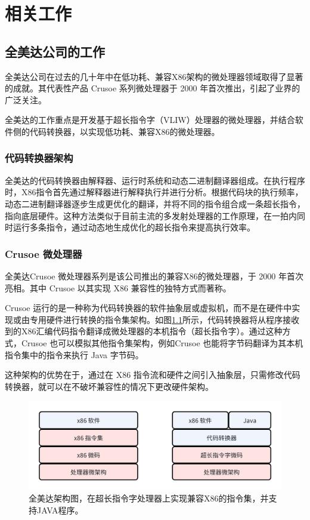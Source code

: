 \chapter{相关工作}\label{chap:related_work}

\section{全美达公司的工作}

全美达公司在过去的几十年中在低功耗、兼容X86架构的微处理器领域取得了显著的成就。其代表性产品 Crusoe 系列微处理器于 2000 年首次推出，引起了业界的广泛关注。

全美达的工作重点是开发基于超长指令字（VLIW）处理器的微处理器，并结合软件侧的代码转换器，以实现低功耗、兼容X86的微处理器。

\subsection{代码转换器架构}

全美达的代码转换器\cite{dehnertTransmetaCodeMorphing2003}由解释器、运行时系统和动态二进制翻译器组成。在执行程序时，X86指令首先通过解释器进行解释执行并进行分析。根据代码块的执行频率，动态二进制翻译器逐步生成更优化的翻译，并将不同的指令组合成一条超长指令，指向底层硬件。这种方法类似于目前主流的多发射处理器的工作原理，在一拍内同时运行多条指令，通过动态地生成优化的超长指令来提高执行效率。

\subsection{Crusoe 微处理器}

全美达Crusoe 微处理器系列是该公司推出的兼容X86的微处理器，于 2000 年首次亮相。其中 Crusoe 以其实现 X86 兼容性的独特方式而著称。

Crusoe 运行的是一种称为代码转换器的软件抽象层或虚拟机，而不是在硬件中实现或由专用硬件进行转换的指令集架构。如图\ref{img:transmeta_arch}所示，代码转换器将从程序接收到的X86汇编代码指令翻译成微处理器的本机指令（超长指令字）。通过这种方式，Crusoe 也可以模拟其他指令集架构，例如Crusoe 也能将字节码翻译为其本机指令集中的指令来执行 Java 字节码。

这种架构的优势在于，通过在 X86 指令流和硬件之间引入抽象层，只需修改代码转换器，就可以在不破坏兼容性的情况下更改硬件架构。

\begin{figure}[h]
    \centering
    \includegraphics[width=0.8\linewidth]{./feishuImage/transmeta_arch.png}
    \caption{全美达架构图，在超长指令字处理器上实现兼容X86的指令集，并支持JAVA程序。}
    \label{img:transmeta_arch}
  \end{figure}


